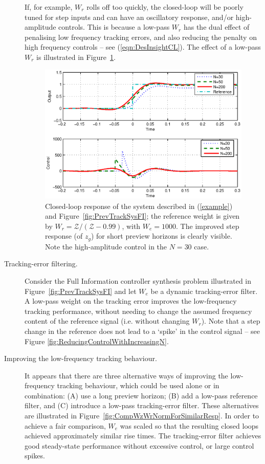 \documentclass[a4paper,12pt]{article}
\theoremstyle{remark}
\newcommand{\z}{\cal{Z}}
\renewcommand{\z}{\mathcal{Z}}
\begin{document}
\begin{description}
If, for example, $W_r$ rolls off too quickly, the closed-loop will be poorly tuned for step inputs and can have an oscillatory response, and/or high-amplitude controls. This is because a low-pass $W_r$ has the dual effect of penalising low frequency tracking errors, and also reducing the penalty on high frequency controls -- see (\ref{eqn:DesInsightCL}).
The effect of a low-pass $W_r$ is illustrated in Figure~\ref{fig:WrWithIncreasingPreview}.
\begin{figure}
\includegraphics[width=\columnwidth]{./Fig_10.eps}
\caption{Closed-loop response of the system described in (\ref{example}) and Figure~\ref{fig:PrevTrackSysFI}; the reference weight is given by $W_r=\z/(\z-0.99)$, with $W_e=1000$. The improved step response (of $z_g$) for short preview horizons is clearly visible. Note the high-amplitude control in the $N=30$ case. \label{fig:WrWithIncreasingPreview}}
\end{figure}
\item[Tracking-error filtering.]
Consider the Full Information controller synthesis problem illustrated in Figure~\ref{fig:PrevTrackSysFI} and let $W_e$ be a dynamic
tracking-error filter. A low-pass weight on the tracking error improves the low-frequency tracking performance, without needing to change the assumed frequency content of the reference signal (i.e. without changing $W_r$). Note that a step change in the reference does not lead to a `spike' in the control signal -- see Figure \ref{fig:ReducingControlWithIncreasingN}. 
\item[Improving the low-frequency tracking behaviour.]
It appears that there are three alternative ways of improving the low-frequency tracking behaviour, which could be used alone or in combination: (A) use a long preview horizon; (B) add a low-pass reference filter, and (C) introduce a low-pass tracking-error filter. These alternatives are illustrated in Figure~\ref{fig:CompWzWrNormForSimilarResp}. In order to achieve a fair comparison, $W_e$ was scaled so that the resulting closed loops achieved approximately similar rise times. The tracking-error filter achieves good steady-state performance without excessive control, or large control spikes.

\end{description}
\end{document}
